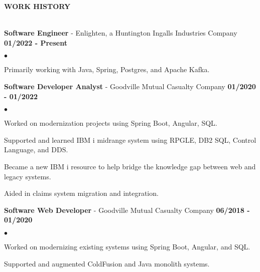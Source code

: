 \documentclass{article}
\newcommand{\lineunder}{
	\vspace*{-4pt}\\ 
	\hspace*{-18pt}\hrulefill \\
}
\newcommand{\header}[1]{
	{\hspace*{-15pt}\vspace*{6pt}\textsc{#1}}\vspace*{-6pt}\lineunder
}
\newcommand{\employer}[3]{
	\textbf{#1} - #2 \vspace*{2pt} \hfill \textbf{#3} \vspace*{2pt}
}
\newenvironment{resumelist}{
	\vspace*{2pt}
	\begin{list}
		{\small$\bullet$}{\topsep 0pt \itemsep -2pt}}{\vspace*{4pt}
	\end{list}
}
\newcommand{\resumeheader}[1]{
	\vspace*{14pt}
	\header{\textbf{#1}}
    \vspace*{5pt}
}
\begin{document}
	\resumeheader{WORK HISTORY}
		\employer
			{Software Engineer}{Enlighten, a Huntington Ingalls Industries Company}{01/2022 - Present}
			\begin{resumelist}
				\item Primarily working with Java, Spring, Postgres, and Apache Kafka.
			\end{resumelist}
			\vspace*{6pt}
        \employer
			{Software Developer Analyst}{Goodville Mutual Casualty Company}{01/2020 - 01/2022}
			\begin{resumelist}
				\item Worked on modernization projects using Spring Boot, Angular, SQL.
				\item Supported and learned IBM i midrange system using RPGLE, DB2 SQL, Control Language, and DDS.
				\item Became a new IBM i resource to help bridge the knowledge gap between web and legacy systems.
				\item Aided in claims system migration and integration.
			\end{resumelist}
            \vspace*{6pt}
		\employer
			{Software Web Developer}{Goodville Mutual Casualty Company}{06/2018 - 01/2020}
			\begin{resumelist}
				\item Worked on modernizing existing systems using Spring Boot, Angular, and SQL.
				\item Supported and augmented ColdFusion and Java monolith systems.
			\end{resumelist}
	
\end{document}
